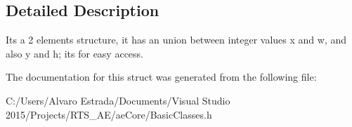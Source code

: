\subsection{Detailed Description}
It\textquotesingle{}s a 2 elements structure, it has an union between integer values x and w, and also y and h; it\textquotesingle{}s for easy access. 

The documentation for this struct was generated from the following file\+:\begin{DoxyCompactItemize}
\item 
C\+:/\+Users/\+Alvaro Estrada/\+Documents/\+Visual Studio 2015/\+Projects/\+R\+T\+S\+\_\+\+A\+E/ae\+Core/Basic\+Classes.\+h\end{DoxyCompactItemize}
